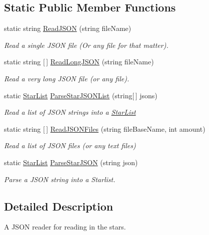 \subsection*{Static Public Member Functions}
\begin{DoxyCompactItemize}
\item 
static string \mbox{\hyperlink{class_j_s_o_n_reader_a9b5c860661574454a2d498ec224a1809}{Read\+J\+S\+ON}} (string file\+Name)
\begin{DoxyCompactList}\small\item\em Read a single J\+S\+ON file (Or any file for that matter). \end{DoxyCompactList}\item 
static string \mbox{[}$\,$\mbox{]} \mbox{\hyperlink{class_j_s_o_n_reader_a357e6392396016b03de0a61951d31fc4}{Read\+Long\+J\+S\+ON}} (string file\+Name)
\begin{DoxyCompactList}\small\item\em Read a very long J\+S\+ON file (or any file). \end{DoxyCompactList}\item 
static \mbox{\hyperlink{class_star_list}{Star\+List}} \mbox{\hyperlink{class_j_s_o_n_reader_aa67d1a5e3aba0b5202776571eacc2062}{Parse\+Star\+J\+S\+O\+N\+List}} (string\mbox{[}$\,$\mbox{]} jsons)
\begin{DoxyCompactList}\small\item\em Read a list of J\+S\+ON strings into a \mbox{\hyperlink{class_star_list}{Star\+List}} \end{DoxyCompactList}\item 
static string \mbox{[}$\,$\mbox{]} \mbox{\hyperlink{class_j_s_o_n_reader_a3995d1ee97e2755b0fcc97700e5253af}{Read\+J\+S\+O\+N\+Files}} (string file\+Base\+Name, int amount)
\begin{DoxyCompactList}\small\item\em Read a list of J\+S\+ON files (or any text files) \end{DoxyCompactList}\item 
static \mbox{\hyperlink{class_star_list}{Star\+List}} \mbox{\hyperlink{class_j_s_o_n_reader_ae385710fbe5cd84513a4282b6465ed36}{Parse\+Star\+J\+S\+ON}} (string json)
\begin{DoxyCompactList}\small\item\em Parse a J\+S\+ON string into a Starlist. \end{DoxyCompactList}\end{DoxyCompactItemize}


\subsection{Detailed Description}
A J\+S\+ON reader for reading in the stars. 



